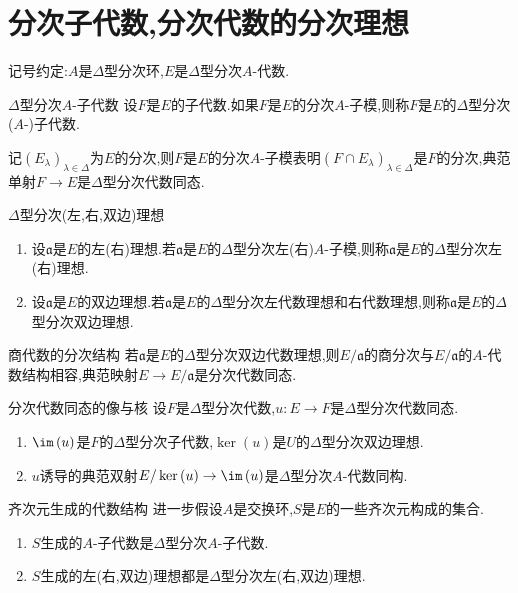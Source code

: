 \section{分次子代数,分次代数的分次理想}

记号约定:$A$是$\Delta$型分次环,$E$是$\Delta$型分次$A$-代数.

\begin{definition}{$\Delta$型分次$A$-子代数}{}
	设$F$是$E$的子代数.如果$F$是$E$的分次$A$-子模,则称$F$是$E$的$\Delta$型分次($A$-)子代数.
\end{definition}

\begin{remark}{}{}
	记$\left(E_{\lambda}\right)_{\lambda\in\Delta}$为$E$的分次,则$F$是$E$的分次$A$-子模表明$\left(F\cap E_{\lambda}\right)_{\lambda\in\Delta}$是$F$的分次,典范单射$F\to E$是$\Delta$型分次代数同态.
\end{remark}

\begin{definition}{$\Delta$型分次(左,右,双边)理想}{}
	\begin{enumerate}
		\item 设$\mathfrak{a}$是$E$的左(右)理想.若$\mathfrak{a}$是$E$的$\Delta$型分次左(右)$A$-子模,则称$\mathfrak{a}$是$E$的$\Delta$型分次左(右)理想.
		\item 设$\mathfrak{a}$是$E$的双边理想.若$\mathfrak{a}$是$E$的$\Delta$型分次左代数理想和右代数理想,则称$\mathfrak{a}$是$E$的$\Delta$型分次双边理想.
	\end{enumerate}
\end{definition}

\begin{proposition}{商代数的分次结构}{}
	若$\mathfrak{a}$是$E$的$\Delta$型分次双边代数理想,则$E/\mathfrak{a}$的商分次与$E/\mathfrak{a}$的$A$-代数结构相容,典范映射$E\to E/\mathfrak{a}$是分次代数同态.
\end{proposition}

\begin{proposition}{分次代数同态的像与核}{}
	设$F$是$\Delta$型分次代数,$u:E\to F$是$\Delta$型分次代数同态.
	\begin{enumerate}
		\item $\im\left(u\right)$是$F$的$\Delta$型分次子代数,$\ker\left(u\right)$是$U$的$\Delta$型分次双边理想.
		\item $u$诱导的典范双射$E/\ker\left(u\right)\to\im\left(u\right)$是$\Delta$型分次$A$-代数同构.
	\end{enumerate}
\end{proposition}

\begin{proposition}{齐次元生成的代数结构}{}
	进一步假设$A$是交换环,$S$是$E$的一些齐次元构成的集合.
	\begin{enumerate}
		\item $S$生成的$A$-子代数是$\Delta$型分次$A$-子代数.
		\item $S$生成的左(右,双边)理想都是$\Delta$型分次左(右,双边)理想.
	\end{enumerate}
\end{proposition}





